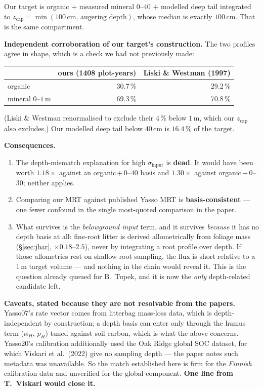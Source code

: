 \documentclass[11pt]{article}
\newcommand{\sinput}{\sigma_{\mathrm{input}}}
\begin{document}
Our target is organic $+$ measured mineral $0$--$40$ $+$ modelled deep tail integrated to
$z_{\mathrm{cap}}=\min(100\,\text{cm},\,\text{augering depth})$, whose median is exactly $100$\,cm.
That is the same compartment.

\textbf{Independent corroboration of our target's construction.} The two profiles agree in shape,
which is a check we had not previously made:

\begin{center}\small
\begin{tabular}{@{}lrr@{}}
\toprule
 & ours (1408 plot-years) & Liski \& Westman (1997) \\
\midrule
organic            & 30.7\,\% & 29.2\,\% \\
mineral $0$--$1$\,m & 69.3\,\% & 70.8\,\% \\
\bottomrule
\end{tabular}
\end{center}

\noindent(Liski \& Westman renormalised to exclude their $4\,\%$ below $1$\,m, which our
$z_{\mathrm{cap}}$ also excludes.) Our modelled deep tail below $40$\,cm is $16.4\,\%$ of the target.

\textbf{Consequences.}
\begin{enumerate}
\item The depth-mismatch explanation for high $\sinput$ is \textbf{dead}. It would have been worth
      $1.18\times$ against an organic\,$+$\,$0$--$40$ basis and $1.30\times$ against
      organic\,$+$\,$0$--$30$; neither applies.
\item Comparing our MRT against published Yasso MRT is \textbf{basis-consistent} --- one fewer
      confound in the single most-quoted comparison in the paper.
\item What survives is the \emph{belowground input} term, and it survives \emph{because} it has no
      depth basis at all: fine-root litter is derived allometrically from foliage mass
      (\S\ref{sec:jbar}, $\times 0.18$--$2.5$), never by integrating a root profile over depth. If
      those allometries rest on shallow root sampling, the flux is short relative to a $1$\,m target
      volume --- and nothing in the chain would reveal it. This is the question already queued for
      B.\ Tupek, and it is now the \emph{only} depth-related candidate left.
\end{enumerate}

\textbf{Caveats, stated because they are not resolvable from the papers.} Yasso07's rate vector comes
from litterbag mass-loss data, which is depth-independent by construction; a depth basis can enter
only through the humus term ($\alpha_H$, $p_H$) tuned against soil carbon, which is what the above
concerns. Yasso20's calibration additionally used the Oak Ridge global SOC dataset, for which
Viskari et al.\ (2022) give no sampling depth --- the paper notes such metadata was unavailable.
So the match established here is firm for the \emph{Finnish} calibration data and unverified for the
global component. \textbf{One line from T.\ Viskari would close it.}
\end{document}
